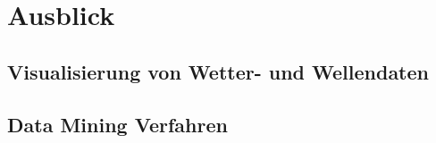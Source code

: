 \chapter{Ausblick}

\section{Visualisierung von Wetter- und Wellendaten}

\section{Data Mining Verfahren}
\cite{Seagaran2007}


